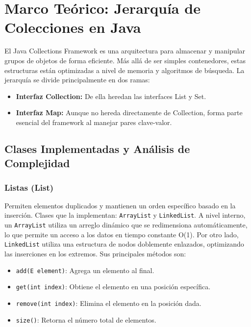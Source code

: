 \documentclass[12pt, letterpaper]{article}
\begin{document}
	\section{Marco Teórico: Jerarquía de Colecciones en Java}
	
	El Java Collections Framework es una arquitectura para almacenar y manipular grupos de objetos de forma eficiente. Más allá de ser simples contenedores, estas estructuras están optimizadas a nivel de memoria y algoritmos de búsqueda. La jerarquía se divide principalmente en dos ramas: 
	\begin{itemize}
		\item \textbf{Interfaz Collection:} De ella heredan las interfaces List y Set.
		\item \textbf{Interfaz Map:} Aunque no hereda directamente de Collection, forma parte esencial del framework al manejar pares clave-valor.
	\end{itemize}
	
	\subsection{Clases Implementadas y Análisis de Complejidad}
	
	\subsubsection{Listas (List)}
	Permiten elementos duplicados y mantienen un orden específico basado en la inserción. Clases que la implementan: \texttt{ArrayList} y \texttt{LinkedList}. 
	A nivel interno, un \texttt{ArrayList} utiliza un arreglo dinámico que se redimensiona automáticamente, lo que permite un acceso a los datos en tiempo constante O(1). Por otro lado, \texttt{LinkedList} utiliza una estructura de nodos doblemente enlazados, optimizando las inserciones en los extremos. Sus principales métodos son:
	\begin{itemize}
		\item \texttt{add(E element)}: Agrega un elemento al final.
		\item \texttt{get(int index)}: Obtiene el elemento en una posición específica.
		\item \texttt{remove(int index)}: Elimina el elemento en la posición dada.
		\item \texttt{size()}: Retorna el número total de elementos.
	\end{itemize}
	
\end{document}
